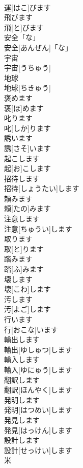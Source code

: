\documentclass[8pt]{extreport}
\begin{document}
\begin{CJK}{UTF8}{min}
\\	運[はこ]びます	
\\	飛びます	
\\	飛[と]びます	
\\	安全「な」	
\\	安全[あんぜん]「な」	
\\	宇宙	
\\	宇宙[うちゅう]	
\\	地球	
\\	地球[ちきゅう]	
\\	褒めます	
\\	褒[ほ]めます	
\\	叱ります	
\\	叱[しか]ります	
\\	誘います	
\\	誘[さそ]います	
\\	起こします	
\\	起[お]こします	
\\	招待します	
\\	招待[しょうたい]します	
\\	頼みます	
\\	頼[たの]みます	
\\	注意します	
\\	注意[ちゅうい]します	
\\	取ります	
\\	取[と]ります	
\\	踏みます	
\\	踏[ふ]みます	
\\	壊します	
\\	壊[こわ]します	
\\	汚します	
\\	汚[よご]します	
\\	行います	
\\	行[おこな]います	
\\	輸出します	
\\	輸出[ゆしゅつ]します	
\\	輸入します	
\\	輸入[ゆにゅう]します	
\\	翻訳します	
\\	翻訳[ほんやく]します	
\\	発明します	
\\	発明[はつめい]します	
\\	発見します	
\\	発見[はっけん]します	
\\	設計します	
\\	設計[せっけい]します	
\\	米	

\end{CJK}
\end{document}
